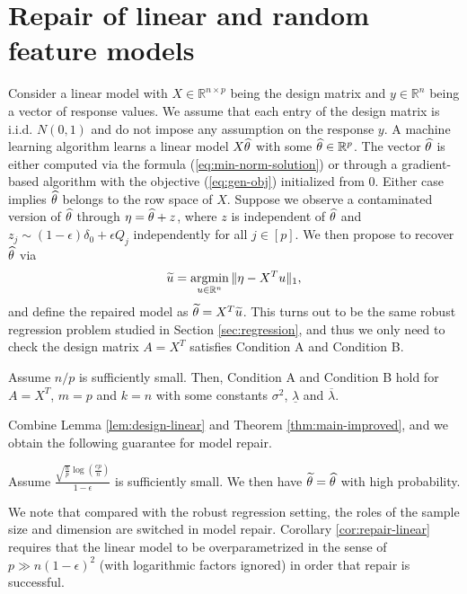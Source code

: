 


\section{Repair of linear and random feature models}
\label{sec:linear}

Consider a linear model with $X\in\mathbb{R}^{n\times p}$ being the design matrix and $y\in\mathbb{R}^n$ being a vector of response values. We assume that each entry of the design matrix is i.i.d. $N(0,1)$ and do not impose any assumption on the response $y$. A machine learning algorithm learns a linear model $X\widehat{\theta}$ with some $\widehat{\theta}\in\mathbb{R}^{p}$. The vector $\widehat{\theta}$ is either computed via the formula (\ref{eq:min-norm-solution}) or through a gradient-based algorithm with the objective (\ref{eq:gen-obj}) initialized from $0$. Either case implies $\widehat{\theta}$ belongs to the row space of $X$. Suppose we observe a contaminated version of $\widehat{\theta}$ through $
\eta=\widehat{\theta}+z$, where $z$ is independent of $\widehat{\theta}$ and $z_j\sim (1-\epsilon)\delta_0+\epsilon Q_j$ independently for all $j\in[p]$. We then propose to recover $\widehat{\theta}$ via
$$\widetilde{u}=\mathop{\rm argmin}_{u\in\mathbb{R}^n}\|\eta-X^Tu\|_1,$$
and define the repaired model as $\widetilde{\theta}=X^T\widetilde{u}$. This turns out to be the same robust regression problem studied in Section \ref{sec:regression}, and thus we only need to check the design matrix $A=X^T$ satisfies Condition A and Condition B.
\begin{lemma}\label{lem:design-linear}
Assume $n/p$ is sufficiently small. Then, Condition A and Condition B hold for $A=X^T$, $m=p$ and $k=n$ with some constants $\sigma^2$, $\underline{\lambda}$ and $\overline{\lambda}$.
\end{lemma}
Combine Lemma \ref{lem:design-linear} and Theorem \ref{thm:main-improved}, and we obtain the following guarantee for model repair.
\begin{corollary}\label{cor:repair-linear}
Assume $\frac{\sqrt{\frac{n}{p}}\log\left(\frac{ep}{n}\right)}{1-\epsilon}$ is sufficiently small. We then have $\widetilde{\theta}=\widehat{\theta}$ with high probability.
\end{corollary}

We note that compared with the robust regression setting, the roles of the sample size and dimension are switched in model repair. Corollary \ref{cor:repair-linear} requires that the linear model to be overparametrized in the sense of $p\gg n(1-\epsilon)^2$ (with logarithmic factors ignored) in order that repair is successful. 

